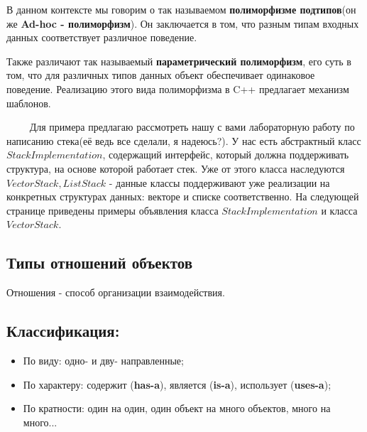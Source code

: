 \begin{notice}
В данном контексте мы говорим о так называемом \textbf{полиморфизме подтипов}(он же \textbf{Ad-hoc - полиморфизм}). Он заключается в том, что разным типам входных данных соответствует различное поведение.

Также различают так называемый \textbf{параметрический полиморфизм}, его суть в том, что для различных типов данных объект обеспечивает одинаковое поведение. Реализацию этого вида полиморфизма в C++ предлагает механизм шаблонов.

\end{notice}

$\qquad$ Для примера предлагаю рассмотреть нашу с вами лабораторную работу по написанию стека(её ведь все сделали, я надеюсь?). У нас есть абстрактный класс $StackImplementation$, содержащий интерфейс, который должна поддерживать структура, на основе которой работает стек. Уже от этого класса наследуются $VectorStack, ListStack$ - данные классы поддерживают уже реализации на конкретных структурах данных: векторе и списке соответственно. На следующей странице приведены примеры объявления класса $StackImplementation$ и класса $VectorStack$.
\newpage
\lstset{language=C++, keepspaces = true, extendedchars=\false}

\lstset{language=C++, keepspaces = true, extendedchars=\false}


\newpage

\subsection{Типы отношений объектов}
\begin{definition}
    Отношения - способ организации взаимодействия.
\end{definition}

\subsection{Классификация:}
\begin{itemize}
    \item По виду: одно- и дву- направленные;
    \item По характеру: содержит (\textbf{has-a}), является (\textbf{is-a}), использует (\textbf{uses-a});
    \item По кратности: один на один, один объект на много объектов, много на много...
\end{itemize}

